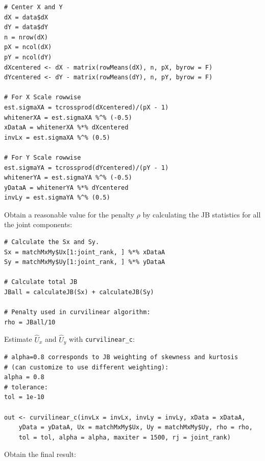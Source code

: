 \begin{verbatim}
# Center X and Y
dX = data$dX
dY = data$dY
n = nrow(dX)
pX = ncol(dX)
pY = ncol(dY)
dXcentered <- dX - matrix(rowMeans(dX), n, pX, byrow = F)
dYcentered <- dY - matrix(rowMeans(dY), n, pY, byrow = F)

# For X Scale rowwise
est.sigmaXA = tcrossprod(dXcentered)/(pX - 1)
whitenerXA = est.sigmaXA %^% (-0.5)
xDataA = whitenerXA %*% dXcentered
invLx = est.sigmaXA %^% (0.5)

# For Y Scale rowwise
est.sigmaYA = tcrossprod(dYcentered)/(pY - 1)
whitenerYA = est.sigmaYA %^% (-0.5)
yDataA = whitenerYA %*% dYcentered
invLy = est.sigmaYA %^% (0.5)
\end{verbatim}

Obtain a reasonable value for the penalty \(\rho\) by calculating the JB statistics for all the joint components:

\begin{verbatim}
# Calculate the Sx and Sy.
Sx = matchMxMy$Ux[1:joint_rank, ] %*% xDataA
Sy = matchMxMy$Uy[1:joint_rank, ] %*% yDataA

# Calculate total JB
JBall = calculateJB(Sx) + calculateJB(Sy)

# Penalty used in curvilinear algorithm:
rho = JBall/10
\end{verbatim}

Estimate \(\widehat{U}_{x}\) and \(\widehat{U}_{y}\) with \texttt{curvilinear\_c}:

\begin{verbatim}
# alpha=0.8 corresponds to JB weighting of skewness and kurtosis
# (can customize to use different weighting):
alpha = 0.8
# tolerance:
tol = 1e-10

out <- curvilinear_c(invLx = invLx, invLy = invLy, xData = xDataA,
    yData = yDataA, Ux = matchMxMy$Ux, Uy = matchMxMy$Uy, rho = rho,
    tol = tol, alpha = alpha, maxiter = 1500, rj = joint_rank)
\end{verbatim}

Obtain the final result:

